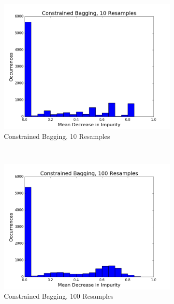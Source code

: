 \begin{figure}[H]
\begin{subfigure}[b]{0.45\textwidth}
    \includegraphics[width=\textwidth]{figures/random_forests/bagging_bias_constrained_bagging_hist_10.png}
    \caption{Constrained Bagging, 10 Resamples}
    \label{fig:bagging-bias-constrained-10}
  \end{subfigure}
  ~
  \begin{subfigure}[b]{0.45\textwidth}
    \includegraphics[width=\textwidth]{figures/random_forests/bagging_bias_constrained_bagging_hist_100.png}
    \caption{Constrained Bagging, 100 Resamples}
    \label{fig:bagging-bias-constrained-100}
  \end{subfigure}
  ~
  \begin{subfigure}[b]{0.45\textwidth}

\end{subfigure}
\end{figure}

